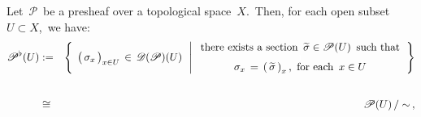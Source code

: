 \vskip 0.5cm
\begin{remark}
\mbox{}\vskip 0.1cm
\noindent
Let \,$\mathscr{P}$\, be a presheaf over a topological space \,$X$.\,
Then, for each open subset \,$U \subset X$,\, we have:
\begin{eqnarray*}
\mathscr{P}^{\flat}(U)
& := &
	\left\{\;\,
		\left(\,\overset{{\color{white}.}}{\sigma_{x}}\,\right)_{x \in U} \,\in\, \mathscr{D}(\mathscr{P})(U)
		\,\;\left\vert\;
			\begin{array}{c}
			\textnormal{there exists a section \,$\widetilde{\sigma} \in \mathscr{P}(U)$\, such that}
			\\
			\overset{{\color{white}1}}{\textnormal{$\sigma_{x} \,=\, \left(\,\widetilde{\sigma}\,\right)_{x}$\,,\, for each \,$x \in U$}}
			\end{array}
			\right.
		\right\}
\\ & {\color{white}\textnormal{\large$.$}} &
\\
& \cong &
	\mathscr{P}(U)\,\slash\sim\,,

\end{eqnarray*}
\end{remark}
